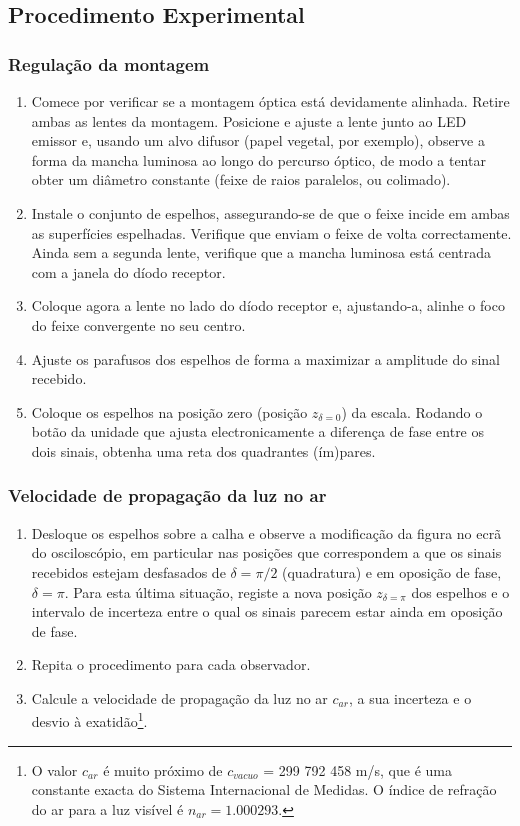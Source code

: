 \documentclass[a4paper,12pt]{article}      %
\begin{document}
\subsection{\sf Procedimento Experimental}
\subsubsection{\sf Regulação da montagem}
 
\begin{enumerate}
\setlength{\itemsep}{0mm}
\item Comece por verificar se a montagem óptica está devidamente alinhada. Retire ambas as lentes da montagem. Posicione e ajuste a lente junto ao LED emissor e, usando um alvo difusor (papel vegetal, por exemplo), observe a forma da mancha luminosa ao longo do percurso óptico, de modo a tentar obter um diâmetro constante (feixe de raios paralelos, ou colimado).
\item Instale o conjunto de espelhos, assegurando-se de que o feixe incide em ambas as superfícies espelhadas. Verifique que enviam o feixe de volta correctamente. Ainda sem a segunda lente, verifique que a mancha luminosa está centrada com  a janela do díodo receptor.
\item Coloque agora a lente no lado do díodo receptor e, ajustando-a, alinhe o foco do feixe convergente no seu centro. 
\item Ajuste os parafusos dos espelhos de forma a maximizar a amplitude do sinal  recebido.
\item Coloque os espelhos na posição zero (posição $z_{\delta=0}$) da escala. Rodando o botão da unidade que ajusta electronicamente a diferença de fase entre os dois sinais, obtenha uma reta dos quadrantes (ím)pares.
\end{enumerate}

\subsubsection{\sf Velocidade de propagação da luz no ar}
\begin{enumerate}
\item Desloque os espelhos sobre a calha e observe a modificação da figura no ecrã do 
osciloscópio, em particular nas posições que correspondem a que os sinais recebidos estejam 
desfasados de $\delta=\pi/2$ (quadratura) e em oposição de fase, $\delta=\pi$. Para esta última situação, registe a 
nova posição $z_{\delta=\pi}$ dos espelhos e o intervalo de incerteza entre o qual os sinais parecem estar ainda em 
oposição de fase. 
\item Repita o procedimento para cada observador. 
\item Calcule a velocidade de propagação da luz no ar $c_{ar}$, a sua incerteza e o desvio à exatidão\footnote{O valor $c_{ar}$ é muito próximo de $c_{vacuo}$ = 299 792 458 m/s, que é uma constante exacta do Sistema Internacional de Medidas. O índice de refração do ar para a luz visível é $n_{ar}=1.000293$.}. 
\end{enumerate}
\end{document}
